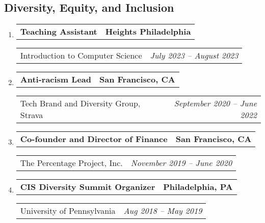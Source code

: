 \documentclass[letterpaper]{article}
\makeatletter
\newif\iflong
\newcommand*{\tabulardef}[3]{\begin{tabular}[t]{@{}lp{\dimexpr\linewidth-#1}@{}}
    #2&#3
\end{tabular}}
\newcommand{\headerrow}[2]
{\begin{tabular*}{\linewidth}{l@{\extracolsep{\fill}}r}
	#1 &
	#2 \\
\end{tabular*}}
\makeatother
\begin{document}
\subsection*{Diversity, Equity, and Inclusion}
\begin{enumerate}[label=]
	\parskip=-0.05em
    \item
		\headerrow
			{\textbf{Teaching Assistant}}
			{\textbf{Heights Philadelphia}}
	\headerrow
		{Introduction to Computer Science}
		{\emph{July 2023 -- August 2023}}
    \iflong
	\begin{enumerate}[label= *]
		\parskip=-0.1em
    \item\tabulardef{5cm}{}{Introduce computer science to middle school students from underrepresented backgrounds in STEM using various in-class exercises}
	\end{enumerate}
    \fi

	\item
		\headerrow
			{\textbf{Anti-racism Lead}}
			{\textbf{San Francisco, CA}}
	\headerrow
		{Tech Brand and Diversity Group, Strava}
		{\emph{September 2020 -- June 2022}}
    \iflong
	\begin{enumerate}[label= *]
	\parskip=-0.1em
		\item\tabulardef{5cm}{}{Lead a group in the technology organization focused on initiatives that could be taken to support diversity, equity, and inclusion, and anti-racism}
	\end{enumerate}
    \fi

	\item
		\headerrow
			{ \textbf{Co-founder and Director of Finance}}
			{\textbf{San Francisco, CA}}
	\headerrow
		{The Percentage Project, Inc.}
		{\emph{November 2019 -- June 2020}}
    \iflong
	\begin{enumerate}[label= *]
	\parskip=-0.1em
		\item\tabulardef{5cm}{}{Kickstarted financial and accounting systems for nonprofit organization dedicated to helping every person of every background embrace their diversity and feel a sense of belonging in the field that they pursue}
	\end{enumerate}
    \fi

	\item
		\headerrow
			{\textbf{CIS Diversity Summit Organizer}}
			{\textbf{Philadelphia, PA}}
	\headerrow
		{University of Pennsylvania}
		{\emph{Aug 2018 -- May 2019}}
    \iflong
	\begin{enumerate}[label= *]
	\parskip=-0.1em
		\item\tabulardef{5cm}{}{Collaborate in organizing a summit bringing together all members of the computer and information science community to determine how to work together to create a more diverse, inclusive, and supportive environment}
	\end{enumerate}
    \fi


\end{enumerate}
\end{document}
